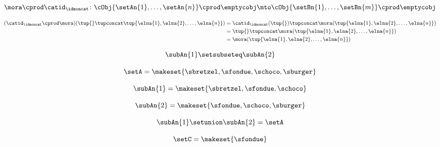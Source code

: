{\begin{forslides}
        \begin{equation}
            \label{eq:parallelism-068}
            \mora \cprod \catid_\idmoncat \colon \cObj{\setAn{1}, \ldots, \setAn{n}} \cprod \emptycobj \mto \cObj{\setBn{1}, \ldots, \setBn{m}} \cprod \emptycobj
        \end{equation}

        \begin{align*}
            \label{eq:parallelism-069}
            (\catid_\idmoncat \cprod \mora) (\tup{} \tupconcat \tup{\elna{1}, \elna{2}, \ldots, \elna{n}}) & = \catid_\idmoncat (\tup{}) \tupconcat \mora(\tup{\elna{1}, \elna{2}, \ldots, \elna{n}}) \\ &= \tup{} \tupconcat \mora(\tup{\elna{1}, \elna{2}, \ldots, \elna{n}}) \\
                                                                                                           & = \mora(\tup{\elna{1}, \elna{2}, \ldots, \elna{n}})
        \end{align*}

        \begin{equation}
            \label{eq:parallelism-070}
            \subAn{1} \setsubseteq \subAn{2}
        \end{equation}

        \begin{equation}
            \label{eq:parallelism-071}
            \setA = \makeset{ \sbretzel, \sfondue, \schoco, \sburger }
        \end{equation}

        \begin{equation}
            \label{eq:parallelism-071b}
            \subAn{1} = \makeset{ \sbretzel, \sfondue, \schoco }
        \end{equation}

        \begin{equation}
            \label{eq:parallelism-072}
            \subAn{2} = \makeset{\sfondue, \schoco, \sburger }
        \end{equation}

        \begin{equation}
            \label{eq:parallelism-073}
            \subAn{1} \setunion \subAn{2} = \setA
        \end{equation}

        \begin{equation}
            \label{eq:parallelism-074}
            \setC = \makeset{ \sfondue }
        \end{equation}


\end{forslides}}
